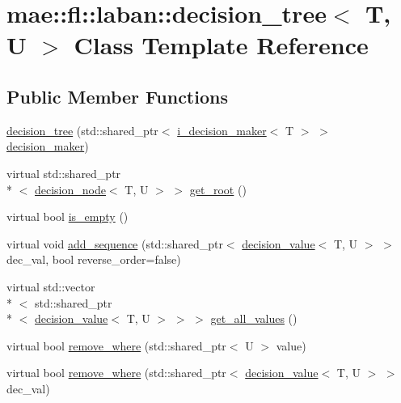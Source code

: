 \hypertarget{classmae_1_1fl_1_1laban_1_1decision__tree}{\section{mae\-:\-:fl\-:\-:laban\-:\-:decision\-\_\-tree$<$ T, U $>$ Class Template Reference}
\label{classmae_1_1fl_1_1laban_1_1decision__tree}
}
\subsection*{Public Member Functions}
\begin{DoxyCompactItemize}
\item 
\hyperlink{classmae_1_1fl_1_1laban_1_1decision__tree_ab918f661eaae6c18a4ac8700f13454c7}{decision\-\_\-tree} (std\-::shared\-\_\-ptr$<$ \hyperlink{classmae_1_1fl_1_1laban_1_1i__decision__maker}{i\-\_\-decision\-\_\-maker}$<$ T $>$ $>$ \hyperlink{classmae_1_1fl_1_1laban_1_1decision__maker}{decision\-\_\-maker})
\item 
virtual std\-::shared\-\_\-ptr\\*
$<$ \hyperlink{classmae_1_1fl_1_1laban_1_1decision__node}{decision\-\_\-node}$<$ T, U $>$ $>$ \hyperlink{classmae_1_1fl_1_1laban_1_1decision__tree_aaa7efdd0681f2497ab55c17955afbe53}{get\-\_\-root} ()
\item 
virtual bool \hyperlink{classmae_1_1fl_1_1laban_1_1decision__tree_ac41afc5b3c8000c5662893eee910d163}{is\-\_\-empty} ()
\item 
virtual void \hyperlink{classmae_1_1fl_1_1laban_1_1decision__tree_a6ddca3f455802ed8417473abeaab782b}{add\-\_\-sequence} (std\-::shared\-\_\-ptr$<$ \hyperlink{classmae_1_1fl_1_1laban_1_1decision__value}{decision\-\_\-value}$<$ T, U $>$ $>$ dec\-\_\-val, bool reverse\-\_\-order=false)
\item 
virtual std\-::vector\\*
$<$ std\-::shared\-\_\-ptr\\*
$<$ \hyperlink{classmae_1_1fl_1_1laban_1_1decision__value}{decision\-\_\-value}$<$ T, U $>$ $>$ $>$ \hyperlink{classmae_1_1fl_1_1laban_1_1decision__tree_a881223f0b283f7a6dc666fcf308b1db9}{get\-\_\-all\-\_\-values} ()
\item 
virtual bool \hyperlink{classmae_1_1fl_1_1laban_1_1decision__tree_a5131ee63acd1d486b5f6941eca413797}{remove\-\_\-where} (std\-::shared\-\_\-ptr$<$ U $>$ value)
\item 
virtual bool \hyperlink{classmae_1_1fl_1_1laban_1_1decision__tree_abe21b12fe75af8930074661bad98de70}{remove\-\_\-where} (std\-::shared\-\_\-ptr$<$ \hyperlink{classmae_1_1fl_1_1laban_1_1decision__value}{decision\-\_\-value}$<$ T, U $>$ $>$ dec\-\_\-val)

\end{DoxyCompactItemize}
